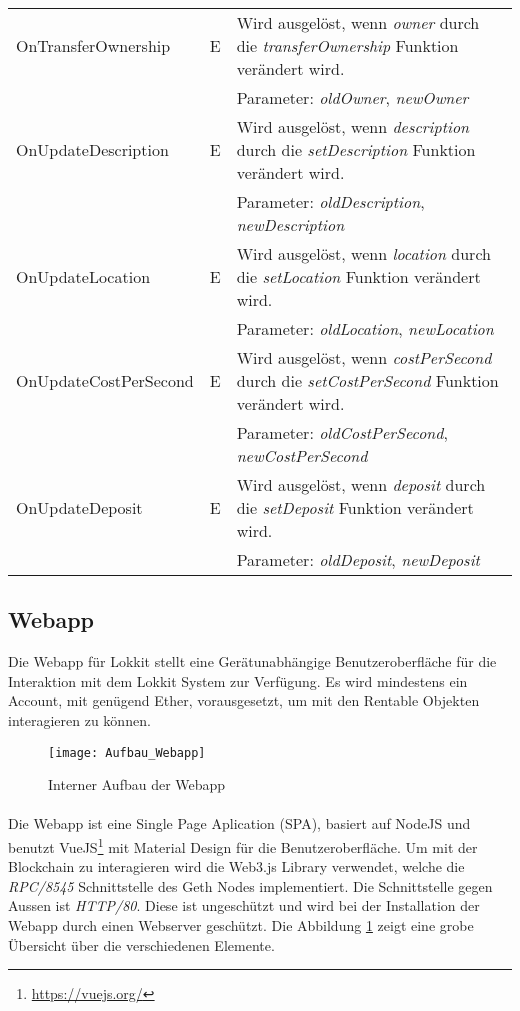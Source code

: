 \begin{longtable}{@{}lcL{9cm}@{}}
OnTransferOwnership              & E   & Wird ausgelöst, wenn \emph{owner} durch die \emph{transferOwnership} Funktion verändert wird.\\ & & Parameter: \emph{oldOwner}, \emph{newOwner} \\ \midrule
OnUpdateDescription              & E   & Wird ausgelöst, wenn \emph{description} durch die \emph{setDescription} Funktion verändert wird.\\ & & Parameter: \emph{oldDescription}, \emph{newDescription} \\ \midrule
OnUpdateLocation              & E   & Wird ausgelöst, wenn \emph{location} durch die \emph{setLocation} Funktion verändert wird.\\ & & Parameter: \emph{oldLocation}, \emph{newLocation} \\ \midrule
OnUpdateCostPerSecond              & E   & Wird ausgelöst, wenn \emph{costPerSecond} durch die \emph{setCostPerSecond} Funktion verändert wird.\\ & & Parameter: \emph{oldCostPerSecond}, \emph{newCostPerSecond} \\ \midrule
OnUpdateDeposit              & E   & Wird ausgelöst, wenn \emph{deposit} durch die \emph{setDeposit} Funktion verändert wird.\\ & & Parameter: \emph{oldDeposit}, \emph{newDeposit} \\
\bottomrule
\end{longtable}

\subsection{Webapp}
\label{sys_subsec:Webapp}

Die Webapp für Lokkit stellt eine Gerätunabhängige Benutzeroberfläche für die Interaktion mit dem Lokkit System zur Verfügung. Es wird mindestens ein Account, mit genügend Ether, vorausgesetzt, um mit den Rentable Objekten interagieren zu können.

\begin{figure}[H]
\centering
\texttt{[image: Aufbau\_Webapp]}
\caption{Interner Aufbau der Webapp}
\label{fig:Aufbau der Webapp}
\end{figure}

\paragraph{}
Die Webapp ist eine Single Page Aplication (SPA), basiert auf NodeJS und benutzt VueJS\footnote{\url{https://vuejs.org/}} mit Material Design für die Benutzeroberfläche. Um mit der Blockchain zu interagieren wird die Web3.js Library verwendet, welche die \emph{RPC/8545} Schnittstelle des Geth Nodes implementiert. 
Die Schnittstelle gegen Aussen ist \emph{HTTP/80}. Diese ist ungeschützt und wird bei der Installation der Webapp durch einen Webserver geschützt. Die Abbildung \ref{fig:Aufbau der Webapp} zeigt eine grobe Übersicht über die verschiedenen Elemente.


